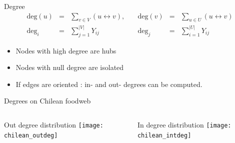 \documentclass[compress,10pt]{beamer}
\begin{document}
\begin{frame}{Degree} 
$$
\begin{array}{cclccl}
\mbox{deg}(u) &=& \sum_{v \in V} (u \leftrightarrow v), \quad &\mbox{deg}(v) &=& \sum_{u \in U} (u \leftrightarrow v)\\
\mbox{deg}_i &=& \sum_{ j  = 1}^{|V|} Y_{ij}&\mbox{deg}_j&=& \sum_{ i  = 1}^{|U|} Y_{ij}
\end{array}
$$

\begin{itemize}
\item Nodes with high degree are \alert{hubs}
\item Nodes with null degree are \alert{isolated}
\item If edges are oriented : in- and out- degrees can be computed. 
\end{itemize}
\end{frame}
\begin{frame}{Degrees on Chilean foodweb} 


\centering
\begin{columns}
\begin{column}{0.5\textwidth}
 \begin{block}{Out degree distribution}
  \texttt{[image: chilean\_outdeg]}
 \end{block}
\end{column}
 \begin{column}{0.5\textwidth}
 \begin{block}{In degree distribution}
  \texttt{[image: chilean\_intdeg]}
 \end{block}
\end{column}

 
\end{columns}

\end{frame}
\end{document}
